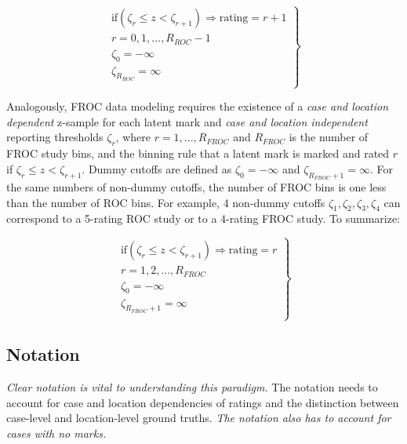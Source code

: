 \documentclass[
]{book}
\begin{document}
\begin{equation}
\left.
\begin{aligned}  
\text{if} \left (\zeta_r \le z < \zeta_{r+1}  \right )\Rightarrow \text {rating} = r+1\\
r = 0, 1, ..., R_{ROC}-1\\
\zeta_0 = -\infty\\
\zeta_{R_{ROC}} = \infty\\
\end{aligned}
\right \}
\label{eq:binning-rule-roc}
\end{equation}

Analogously, FROC data modeling requires the existence of a \emph{case and location dependent} z-sample for each latent mark and \emph{case and location independent} reporting thresholds \(\zeta_r\), where \(r = 1, ..., R_{FROC}\) and \(R_{FROC}\) is the number of FROC study bins, and the binning rule that a latent mark is marked and rated \(r\) if \(\zeta_r \leq z < \zeta_{r+1}\). Dummy cutoffs are defined as \(\zeta_0 = -\infty\) and \(\zeta_{R_{FROC}+1} = \infty\). For the same numbers of non-dummy cutoffs, the number of FROC bins is one less than the number of ROC bins. For example, 4 non-dummy cutoffs \(\zeta_1, \zeta_2, \zeta_3, \zeta_4\) can correspond to a 5-rating ROC study or to a 4-rating FROC study. To summarize:

\begin{equation}
\left.
\begin{aligned}  
\text{if} \left (\zeta_r \le z < \zeta_{r+1}  \right )\Rightarrow \text {rating} = r\\
r = 1, 2, ..., R_{FROC}\\
\zeta_0 = -\infty\\
\zeta_{R_{FROC}+1} = \infty\\
\end{aligned}
\right \}
\label{eq:binning-rule-froc}
\end{equation}

\hypertarget{empirical-notation}{%
\subsection{Notation}\label{empirical-notation}}

\emph{Clear notation is vital to understanding this paradigm.} The notation needs to account for case and location dependencies of ratings and the distinction between case-level and location-level ground truths. \emph{The notation also has to account for cases with no marks.}
\end{document}
